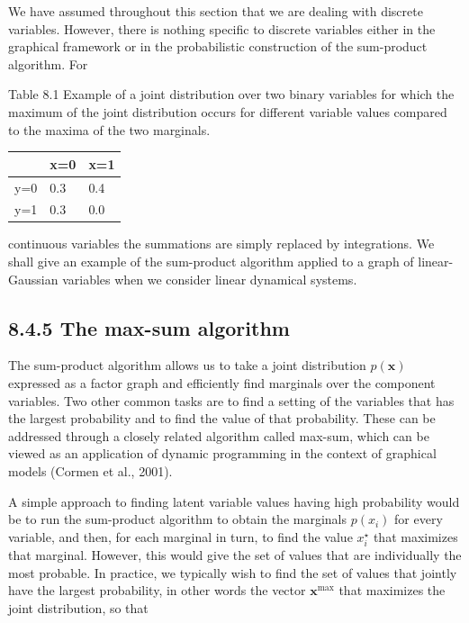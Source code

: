 \documentclass[
  10
]{article}
\newcounter{none} %
\begin{document}
We have assumed throughout this section that we are dealing with
discrete variables. However, there is nothing specific to discrete
variables either in the graphical framework or in the probabilistic
construction of the sum-product algorithm. For

Table 8.1 Example of a joint distribution over two binary variables for
which the maximum of the joint distribution occurs for different
variable values compared to the maxima of the two marginals.

{\def\LTcaptype{none} %
\begin{longtable}[]{@{}|l|l|l|@{}}
\toprule\noalign{}
\endhead
\bottomrule\noalign{}
\endlastfoot
\hline
& x=0 & x=1 \\
\hline
y=0 & 0.3 & 0.4 \\
\hline
y=1 & 0.3 & 0.0 \\
\hline
\end{longtable}
}

continuous variables the summations are simply replaced by integrations.
We shall give an example of the sum-product algorithm applied to a graph
of linear-Gaussian variables when we consider linear dynamical systems.

\subsection{8.4.5 The max-sum algorithm}\label{the-max-sum-algorithm}

The sum-product algorithm allows us to take a joint distribution
\(p ( \mathbf { x } )\) expressed as a factor graph and efficiently find
marginals over the component variables. Two other common tasks are to
find a setting of the variables that has the largest probability and to
find the value of that probability. These can be addressed through a
closely related algorithm called max-sum, which can be viewed as an
application of dynamic programming in the context of graphical models
(Cormen et al., 2001).

A simple approach to finding latent variable values having high
probability would be to run the sum-product algorithm to obtain the
marginals \(p ( x _ { i } )\) for every variable, and then, for each
marginal in turn, to find the value \(x _ { i } ^ { \star }\) that
maximizes that marginal. However, this would give the set of values that
are individually the most probable. In practice, we typically wish to
find the set of values that jointly have the largest probability, in
other words the vector \(\mathbf { x } ^ { \mathrm { { m a x } } }\)
that maximizes the joint distribution, so that
\end{document}
